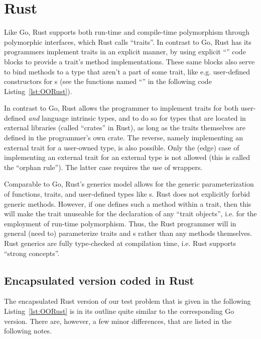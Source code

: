 \documentclass[11pt,oneside]{report}
\newcommand{\code}[1]{{\selectfont\ttfamily{#1}}}
\begin{document}
\section{Rust}

Like Go, Rust supports both run-time and compile-time polymorphism
through polymorphic interfaces, which Rust calls ``traits''. In
contrast to Go, Rust has its programmers implement traits in an
explicit manner, by using explicit ``\code{impl}'' code blocks to
provide a trait's method implementations. These same \code{impl}
blocks also serve to bind methods to a type that aren't a part of some
trait, like e.g. user-defined constructors for \code{struct}s (see the
functions named ``\code{new}'' in the following code
Listing~\ref{lst:OORust}).

In contrast to Go, Rust allows the programmer to implement traits for
both user-defined \emph{and} language intrinsic types, and to do so
for types that are located in external libraries (called ``crates'' in
Rust), as long as the traits themselves are defined in the
programmer's own crate. The reverse, namely implementing an external
trait for a user-owned type, is also possible. Only the (edge) case of
implementing an external trait for an external type is not allowed
(this is called the ``orphan rule''). The latter case requires the use
of wrappers.

Comparable to Go, Rust's generics model allows for the generic
parameterization of functions, traits, and user-defined types like
\code{struct}s. Rust does not explicitly forbid generic
methods. However, if one defines such a method within a trait, then
this will make the trait unuseable for the declaration of any ``trait
objects'', i.e. for the employment of run-time polymorphism. Thus, the
Rust programmer will in general (need to) parameterize traits and
\code{struct}s rather than any methods themselves. Rust generics are
fully type-checked at compilation time, i.e. Rust supports ``strong
concepts''.

\subsection{Encapsulated version coded in Rust}

The encapsulated Rust version of our test problem that is given in the
following Listing~\ref{lst:OORust} is in its outline quite similar to
the corresponding Go version. There are, however, a few minor
differences, that are listed in the following notes.
\end{document}
